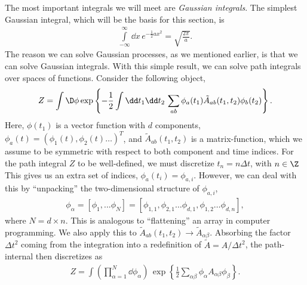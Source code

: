 The most important integrals we will meet are \emph{Gaussian integrals}.
The simplest Gaussian integral, which will be the basis for this section, is
%
\begin{align}\label{eq: gaussian integral}
    \int\limits_{-\infty}^\infty \dd x \, e^{-\frac{1}{2} a x^2} = \sqrt{ \frac{ 2 \pi  }{ a }}.
\end{align}
%
The reason we can solve Gaussian processes, as we mentioned earlier, is that we can solve Gaussian integrals.
With this simple result, we can solve path integrals over spaces of functions.
Consider the following object, 
%
\begin{align}
    Z = \int \D \phi
    \exp \left\{ 
        - \frac{1}{2} \int \dd t_1 \dd t_2 \, 
        \sum_{ab}
        \phi_a(t_1) \tilde{A}_{ab}(t_1, t_2) \phi_b(t_2)
    \right\}.
\end{align}
%
Here, $\phi(t_1)$ is a vector function with $d$ components, $\phi_a(t) = (\phi_1(t), \phi_2(t)\dots)^T$, and $\tilde{A}_{ab}(t_1, t_2)$ is a matrix-function, which we assume to be symmetric with respect to both component and time indices.
For the path integral $Z$ to be well-defined, we must discretize $t_n = n \Delta t$, with $n \in \Z$
This gives us an extra set of indices, $\phi_a(t_i) = \phi_{a,i}$.
However, we can deal with this by ``unpacking'' the two-dimensional structure of $\phi_{a,i}$,
%
\begin{align}
    \phi_\alpha = 
    \left[\phi_1, ... \phi_N\right]
    =
    \left[
        \phi_{1, 1}, \phi_{2, 1}\dots\phi_{d,1}, \phi_{1, 2}\dots\phi_{d, n}
    \right],
\end{align}
%
where $N = d \times n$.
This is analogous to ``flattening'' an array in computer programming.
We also apply this to $\tilde{A}_{ab}(t_1,t_2) \to \tilde{A}_{\alpha\beta}$.
Absorbing the factor $\Delta t^2$ coming from the integration into a redefinition of $\tilde{A} = A/\Delta t^2$,
%
the path-internal then discretizes as 
%
\begin{align}
    Z = \int \left( \prod_{\alpha=1}^N \dd \phi_\alpha \right) \, 
    \exp \left\{ 
        \frac{1}{2} \sum_{\alpha \beta} 
        \phi_\alpha A_{\alpha \beta} \phi_\beta
    \right\}.
\end{align}
